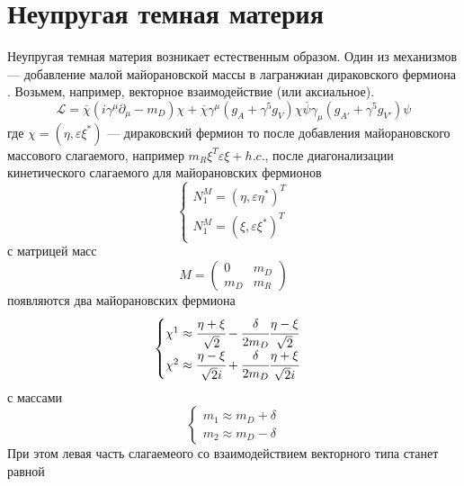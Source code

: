 \section{Неупругая темная материя}
Неупругая темная материя возникает естественным образом. 
Один из механизмов --- добавление малой майорановской массы в лагранжиан дираковского фермиона \cite{PhysRevD.64.043502}.
Возьмем, например, векторное взаимодействие (или аксиальное).
\begin{equation}
	\label{eq:DM_L_naive_kinemat}
	\mathcal{L} = \overline{\chi}(i\gamma^{\mu}\partial_{\mu} - m_D)\chi +
	\overline{\chi}\gamma^{\mu}(g_A + \gamma^5 g_V) \chi \overline{\psi}\gamma_{\mu}(g_{A'} + \gamma^5 g_{V'})\psi
\end{equation}
где $\chi = (\eta,\varepsilon \xi^*)$ --- дираковский фермион
то после добавления майорановского массового слагаемого, например $m_R\xi^T\varepsilon \xi + h.c.$, после диагонализации кинетического слагаемого для майорановских фермионов
\begin{equation}
	\begin{cases}
		N_1^M = (\eta,\varepsilon\eta^*)^T\\
		N_1^M = (\xi,\varepsilon \xi^*)^T
	\end{cases}
\end{equation}
с матрицей масс
\begin{equation}
	M = 
	\begin{pmatrix}
		0 & m_D \\
		m_D & m_R
	\end{pmatrix}
\end{equation}
появляются два майорановских фермиона
\begin{equation}
	\begin{cases}
		\chi^1 \approx \cfrac{\eta + \xi}{\sqrt{2}} - \cfrac{\delta}{2m_D} \cfrac{\eta - \xi}{\sqrt{2} }\\
		\chi^2  \approx \cfrac{\eta - \xi}{\sqrt{2}i} + \cfrac{\delta}{2m_D} \cfrac{\eta + \xi}{\sqrt{2}i }\\
	\end{cases}
\end{equation}
с массами 
\begin{equation}
	\begin{cases}
		m_1 \approx m_D + \delta\\
		m_2 \approx m_D - \delta		
	\end{cases}
\end{equation}
При этом левая часть слагаемеого со взаимодействием векторного типа станет равной
